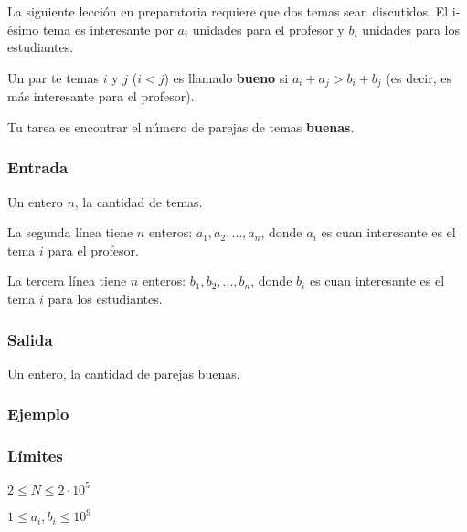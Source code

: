 \problembreak
 
\problemtitle La siguiente lección en preparatoria requiere que dos temas sean discutidos. El i-ésimo tema es interesante por \(a_i\) unidades para el profesor y \(b_i\) unidades para los estudiantes.
 
 Un par te temas \(i\) y \(j\) (\(i<j\)) es llamado \textbf{bueno} si \(a_i+a_j > b_i+b_j\) (es decir, es más interesante para el profesor).
 
 Tu tarea es encontrar el número de parejas de temas \textbf{buenas}.
 \subsubsection*{Entrada}
 Un entero \(n\), la cantidad de temas.
 
 La segunda línea tiene \(n\) enteros: \(a_1,a_2,\ldots, a_n\), donde \(a_i\) es cuan interesante es el tema \(i\) para el profesor.
 
 La tercera línea tiene \(n\) enteros: \(b_1,b_2,\ldots, b_n\), donde \(b_i\) es cuan interesante es el tema \(i\) para los estudiantes.
 
 \subsubsection*{Salida}
 Un entero, la cantidad de parejas buenas.
 
 \subsubsection*{Ejemplo}
 \begin{casebox2}
 \end{casebox2}

\subsubsection*{Límites}
\begin{plimits}
	\item \(2\leq N\leq 2\cdot 10^5\)
	\item \(1\leq a_i, b_i\leq  10^9\)
\end{plimits}
 \codeforces
 
 

